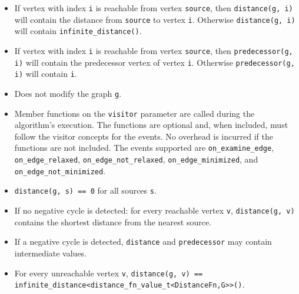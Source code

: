 \begin{itemdescr}
      \pnum\effects
            \begin{itemize}
                  \item
                        If vertex with index \lstinline{i} is reachable from vertex \lstinline{source}, then
                        \lstinline{distance(g, i)} will contain the distance from \lstinline{source} to vertex
                        \lstinline{i}.  Otherwise \lstinline{distance(g, i)} will contain
                        \lstinline{infinite_distance()}.
                  \item
                        If vertex with index \lstinline{i} is reachable
                        from vertex \lstinline{source}, then \lstinline{predecessor(g, i)} will contain the
                        predecessor vertex of vertex \lstinline{i}. Otherwise \lstinline{predecessor(g, i)} will contain
                        \lstinline{i}.
                  \item Does not modify the graph \lstinline{g}.
                  \item Member functions on the \lstinline{visitor} parameter are called during the algorithm's execution.
                        The functions are optional and, when included, must follow the visitor concepts for the events.
                        No overhead is incurred if the functions are not included.
                        The events supported are \lstinline{on_examine_edge}, \lstinline{on_edge_relaxed}, \lstinline{on_edge_not_relaxed},
                        \lstinline{on_edge_minimized}, and \lstinline{on_edge_not_minimized}.
            \end{itemize}
      \pnum\postconditions
            \begin{itemize}
                  \item \lstinline{distance(g, s) == 0} for all sources \lstinline{s}.
                  \item If no negative cycle is detected: for every reachable vertex \lstinline{v},
                        \lstinline{distance(g, v)} contains the shortest distance from the nearest source.
                  \item If a negative cycle is detected, \lstinline{distance} and \lstinline{predecessor}
                        may contain intermediate values.
                  \item For every unreachable vertex \lstinline{v},
                        \lstinline{distance(g, v) == infinite_distance<distance_fn_value_t<DistanceFn,G>>()}.
            \end{itemize}

\end{itemdescr}

